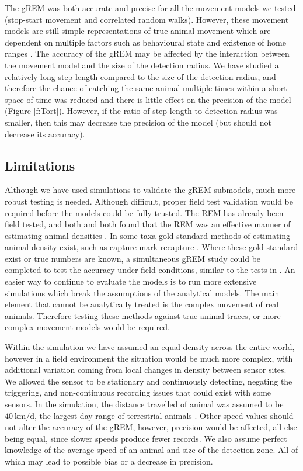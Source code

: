 \documentclass[a4paper,10pt,reqno,oneside]{amsart}
\begin{document}
The gREM was both accurate and precise for all the movement models we tested (stop-start movement and correlated random walks). However, these movement models are still simple representations of true animal movement which are dependent on multiple factors such as behavioural state and existence of home ranges \citep{smouse2010stochastic}. The accuracy of the gREM may be affected by the interaction between the movement model and the size of the detection radius. We have studied a relatively long step length compared to the size of the detection radius, and therefore the chance of catching the same animal multiple times within a short space of time was reduced and there is little effect on the precision of the model (Figure \ref{f:Tort}). However, if the ratio of step length to detection radius was smaller, then this may decrease the precision of the model (but should not decrease its accuracy). 

\subsection*{Limitations}
Although we have used simulations to validate the gREM submodels, much more robust testing is needed. Although difficult, proper field test validation would be required before the models could be fully trusted. The REM \citep{rowcliffe2008estimating} has already been field tested, and both \citet{rowcliffe2008estimating} and \citet{zero2013monitoring} both found that the REM was an effective manner of estimating animal densities \citep{rowcliffe2008estimating, zero2013monitoring}. In some taxa gold standard methods of estimating animal density exist, such as capture mark recapture \citep{sollmann2013using}. Where these gold standard exist or true numbers are known, a simultaneous gREM study could be completed to test the accuracy under field conditions, similar to the tests in \citet{rowcliffe2008estimating}. An easier way to continue to evaluate the models is to run more extensive simulations which break the assumptions of the analytical models. The main element that cannot be analytically treated is the complex movement of real animals. Therefore testing these methods against true animal traces, or more complex movement models would be required.

Within the simulation we have assumed an equal density across the entire world, however in a field environment the situation would be much more complex, with additional variation coming from local changes in density between sensor sites. We allowed the sensor to be stationary and continuously detecting, negating the triggering, and non-continuous recording issues that could exist with some sensors. In the simulation, the distance travelled of animal was assumed to be $\SI{40}{\kilo\meter \per \day}$, the largest day range of terrestrial animals \citep{carbone2005far}. Other speed values should not alter the accuracy of the gREM, however, precision would be affected, all else being equal, since slower speeds produce fewer records. We also assume perfect knowledge of the average speed of an animal and size of the detection zone. All of which may lead to possible bias or a decrease in precision. 
\end{document}
